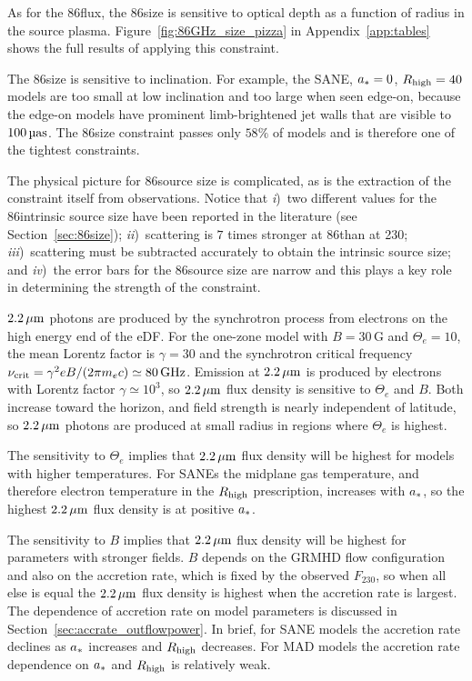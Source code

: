 As for the 86\GHz flux, the 86\GHz size is sensitive to optical depth as a function of radius in the source plasma.
Figure~\ref{fig:86GHz_size_pizza} in Appendix~\ref{app:tables} shows the full results of applying this constraint.

The 86\GHz size is sensitive to inclination.
For example, the SANE, $a_* = 0$, $R_\mathrm{high} = 40$ models are too small at low inclination and too large when seen edge-on, because the edge-on models have prominent limb-brightened jet walls that are visible to $100\uas$.
The 86\GHz size constraint passes only $58\%$ of models and is therefore one of the tightest constraints.

The physical picture for 86\GHz source size is complicated, as is the extraction of the constraint itself from observations.
Notice that
\emph{i})~two different values for the 86\GHz intrinsic source size have been reported in the literature (see Section~\ref{sec:86size});
\emph{ii})~scattering is $7$ times stronger at 86\GHz than at 230\GHz;
\emph{iii})~scattering must be subtracted accurately to obtain the intrinsic source size; and
\emph{iv})~the error bars for the 86\GHz source size are narrow and this plays a key role in determining the strength of the constraint.


$2.2\,\mu\mathrm{m}$ photons are produced by the synchrotron process from electrons on the high energy end of the eDF.
For the one-zone model with $B = 30$\,G and $\Theta_e = 10$, the mean Lorentz factor is $\gamma = 30$ and the synchrotron critical frequency $\nu_\mathrm{crit} = \gamma^2 e B/(2 \pi m_e c) \simeq 80\,\mathrm{GHz}$.
Emission at $2.2\,\mu\mathrm{m}$ is produced by electrons with Lorentz factor $\gamma \simeq 10^3$, so $2.2\,\mu\mathrm{m}$ flux density is sensitive to $\Theta_e$ and $B$.
Both increase toward the horizon, and field strength is nearly independent of latitude, so $2.2\,\mu\mathrm{m}$ photons are produced at small radius in regions where $\Theta_e$ is highest.

The sensitivity to $\Theta_e$ implies that $2.2\,\mu\mathrm{m}$ flux density will be highest for models with higher temperatures.
For SANEs the midplane gas temperature, and therefore electron temperature in the $R_\mathrm{high}$ prescription, increases with $a_*$, so the highest $2.2\,\mu\mathrm{m}$ flux density is at positive $a_*$.

The sensitivity to $B$ implies that $2.2\,\mu\mathrm{m}$ flux density will be highest for parameters with stronger fields.  $B$ depends on the GRMHD flow configuration and also on the accretion rate, which is fixed by the observed $F_{230}$, so when all else is equal the $2.2\,\mu\mathrm{m}$ flux density is highest when the accretion rate is largest.  The dependence of accretion rate on model parameters is discussed in Section~\ref{sec:accrate_outflowpower}.  In brief, for SANE models the accretion rate declines as $a_*$ increases and $R_\mathrm{high}$ decreases. For MAD models the accretion rate dependence on $a_*$ and $R_\mathrm{high}$ is relatively weak.


